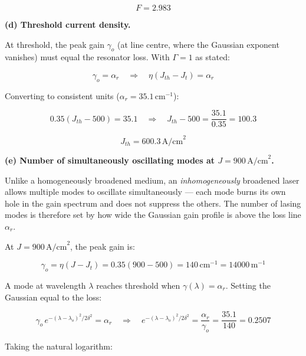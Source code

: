 \begin{equation*}
  \boxed{F = 2.983}
\end{equation*}

\textbf{(d) Threshold current density.}

At threshold, the peak gain $\gamma_o$ (at line centre, where the Gaussian exponent vanishes) must equal the resonator loss. With $\Gamma = 1$ as stated:

\begin{equation*}
  \gamma_o = \alpha_r \quad\Longrightarrow\quad \eta(J_{th} - J_t) = \alpha_r
\end{equation*}

Converting to consistent units ($\alpha_r = 35.1\,\text{cm}^{-1}$):

\begin{equation*}
  0.35(J_{th} - 500) = 35.1 \quad\Longrightarrow\quad J_{th} - 500 = \frac{35.1}{0.35} = 100.3
\end{equation*}

\begin{equation*}
  \boxed{J_{th} = 600.3\,\text{A/cm}^2}
\end{equation*}

\textbf{(e) Number of simultaneously oscillating modes at $J = 900\,\text{A/cm}^2$.}

Unlike a homogeneously broadened medium, an \emph{inhomogeneously} broadened laser allows multiple modes to oscillate simultaneously — each mode burns its own hole in the gain spectrum and does not suppress the others. The number of lasing modes is therefore set by how wide the Gaussian gain profile is above the loss line $\alpha_r$.

At $J = 900\,\text{A/cm}^2$, the peak gain is:

\begin{equation*}
  \gamma_o = \eta(J - J_t) = 0.35(900 - 500) = 140\,\text{cm}^{-1} = 14000\,\text{m}^{-1}
\end{equation*}

A mode at wavelength $\lambda$ reaches threshold when $\gamma(\lambda) = \alpha_r$. Setting the Gaussian equal to the loss:

\begin{equation*}
  \gamma_o\,e^{-(\lambda-\lambda_o)^2/2\delta^2} = \alpha_r \quad\Longrightarrow\quad e^{-(\lambda-\lambda_o)^2/2\delta^2} = \frac{\alpha_r}{\gamma_o} = \frac{35.1}{140} = 0.2507
\end{equation*}

Taking the natural logarithm:

